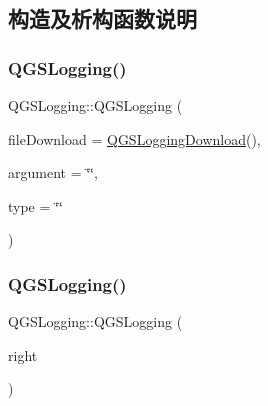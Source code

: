 \subsection{构造及析构函数说明}
\mbox{\label{class_q_g_s_logging_ab992c02ed78bfb4c9ef93b1cbabf750e}} 
\subsubsection{\texorpdfstring{Q\+G\+S\+Logging()}{QGSLogging()}\hspace{0.1cm}{\footnotesize\ttfamily [1/3]}}
{\footnotesize\ttfamily Q\+G\+S\+Logging\+::\+Q\+G\+S\+Logging (\begin{DoxyParamCaption}\item[{const \mbox{\hyperlink{class_q_g_s_logging_1_1_q_g_s_logging_download}{Q\+G\+S\+Logging\+Download}} \&}]{file\+Download = {\ttfamily \mbox{\hyperlink{class_q_g_s_logging_1_1_q_g_s_logging_download}{Q\+G\+S\+Logging\+Download}}()},  }\item[{const Q\+String \&}]{argument = {\ttfamily \char`\"{}\char`\"{}},  }\item[{const Q\+String \&}]{type = {\ttfamily \char`\"{}\char`\"{}} }\end{DoxyParamCaption})}

\mbox{\label{class_q_g_s_logging_a1083fed36fe1598b5463eb42fc65237a}} 
\subsubsection{\texorpdfstring{Q\+G\+S\+Logging()}{QGSLogging()}\hspace{0.1cm}{\footnotesize\ttfamily [2/3]}}
{\footnotesize\ttfamily Q\+G\+S\+Logging\+::\+Q\+G\+S\+Logging (\begin{DoxyParamCaption}\item[{const \mbox{\hyperlink{class_q_g_s_logging}{Q\+G\+S\+Logging}} \&}]{right }\end{DoxyParamCaption})\hspace{0.3cm}{\ttfamily [default]}}

\mbox{\label{class_q_g_s_logging_a601acbf9ba6bc52da8c0fe71975c82a8}} 
